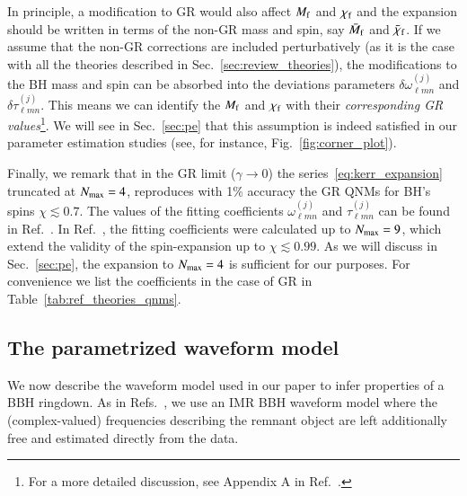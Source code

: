 \documentclass[twocolumn,
               prd,
               aps,
               superscriptaddress,
               tightenlines,
               nofootinbib,
               eqsecnum,
               amsfonts,
               amsmath,
               longbibliography]{revtex4-1}
\newcommand{\hs}[1]{{\textcolor{TealBlue}{{#1}}}}
\begin{document}
In principle, a modification to GR would also affect $M_{\rm f}$ and $\chi_{\rm f}$ and the
expansion should be written in terms of the non-GR mass and spin, say $\bar{M}_{\rm f}$ and
$\bar{\chi}_{\rm f}$. If we assume that the non-GR corrections are included perturbatively
(as it is the case with all the theories described in Sec.~\ref{sec:review_theories}),
the modifications to the BH mass and spin can be absorbed into the deviations
parameters $\delta\omega^{(j)}_{\ell m n}$ and $\delta\tau^{(j)}_{\ell m n}$.
%
This means we can identify the $M_{\rm f}$ and $\chi_{\rm f}$ with their
\emph{corresponding {\rm GR} values}\footnote{For a more detailed discussion, see Appendix A in Ref.~\cite{Maselli:2019mjd}.}.
%
We will see in Sec.~\ref{sec:pe}  that this assumption is indeed
satisfied in our parameter estimation studies (see, for instance, Fig.~\ref{fig:corner_plot}).

Finally, we remark that in the GR limit ($\gamma \to 0$)
the series~\eqref{eq:kerr_expansion} truncated at $N_{\rm max} = 4$, reproduces with 1\% accuracy
the GR QNMs for BH's spins $\chi \lesssim 0.7$.
%
The values of the fitting coefficients $\omega_{\ell m n}^{(j)}$ and $\tau_{\ell m n}^{(j)}$
can be found in Ref.~\cite{Maselli:2019mjd}.
%
In Ref.~\cite{Carullo:2021dui}, the fitting coefficients were calculated up to $N_{\rm max} = 9$,
which extend the validity of the spin-expansion up to $\chi \lesssim 0.99$.
%
As we will discuss in Sec.~\ref{sec:pe}, the expansion to $N_{\rm max} = 4$ is
sufficient for our purposes. For convenience we list the coefficients in the case of
GR in Table~\ref{tab:ref_theories_qnms}.

\subsection{The parametrized waveform model}
\label{sec:review_pSEOB}

We now describe the waveform model used in our paper to infer properties of a
BBH ringdown.
%
As in Refs.~\cite{Brito:2018rfr,Ghosh:2021mrv}, we use an IMR BBH waveform
model where the (complex\hs{-valued}) frequencies describing the remnant object
are left additionally free and estimated directly from the data.
\end{document}
